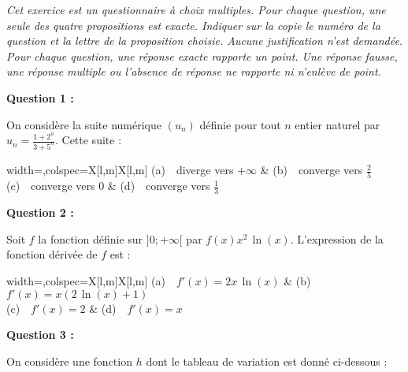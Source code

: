 \emph{Cet exercice est un questionnaire à choix multiples. Pour chaque question, une seule des quatre propositions est exacte. Indiquer sur la copie le numéro de la question et la lettre de la proposition choisie. Aucune justification n'est demandée.\\
Pour chaque question, une réponse exacte rapporte un point. Une réponse fausse, une réponse multiple ou l'absence de réponse ne rapporte ni n'enlève de point.}

\bigskip

\textbf{Question 1 :}

\smallskip

On considère la suite numérique $\left(u_n\right)$ définie pour tout $n$ entier naturel par $u_n = \frac{1+2^n}{3+5^n}$. Cette suite :

\medskip

\begin{tblr}{width=\linewidth,colspec={X[l,m]X[l,m]}}%
	(a)~~diverge vers $+\infty$ & (b)~~converge vers $\tfrac{2}{5}$ \\
	(c)~~converge vers 0 & (d)~~converge vers $\tfrac{1}{3}$
\end{tblr}

\bigskip

\textbf{Question 2 :}

\medskip

Soit $f$ la fonction définie sur $]0;+\infty[$ par $f(x) x^2\,\ln(x)$. L'expression de la fonction dérivée de $f$ est :

\medskip

\begin{tblr}{width=\linewidth,colspec={X[l,m]X[l,m]}}%
	(a)~~$f'(x)=2x\,\ln(x)$ & (b)~~$f'(x)=x(2\,\ln(x)+1)$ \\
	(c)~~$f'(x)=2$ & (d)~~$f'(x)=x$
\end{tblr}

\bigskip

\textbf{Question 3 :}

\medskip

On considère une fonction $h$ dont le tableau de variation est donné ci-dessous : 

\begin{center}
\end{center}

